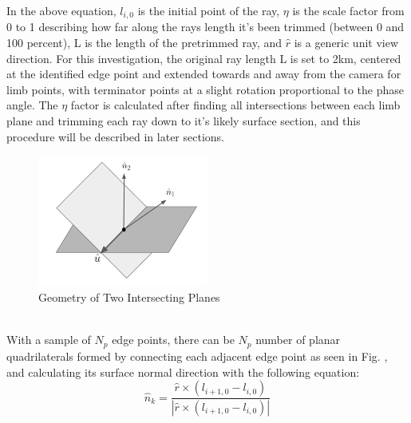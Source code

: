 In the above equation, $l_{i,0}$ is the initial point of the ray, $\eta$ is the scale factor from 0 to 1 describing how far along the rays length it's been trimmed (between 0 and 100 percent), L is the length of the pretrimmed ray, and $\hat{r}$ is a generic unit view direction. For this investigation, the original ray length L is set to 2km, centered at the identified edge point and extended towards and away from the camera for limb points, with terminator points at a slight rotation proportional to the phase angle. The $\eta$ factor is calculated after finding all intersections between each limb plane and trimming each ray down to it's likely surface section, and this procedure will be described in later sections.
\begin{figure}
    \centering
    \captionsetup{justification=centering}
    \includegraphics[width = 0.5\textwidth]{fig/planes_intersect.png}
    \caption{Geometry of Two Intersecting Planes}
    \label{fig:two_intersect}
\end{figure}
\\With a sample of $N_p$ edge points, there can be $N_p$ number of planar quadrilaterals formed by connecting each adjacent edge point as seen in Fig. 
, and calculating its surface normal direction with the following equation:
\begin{equation}
\hat{n}_k = \frac{\hat{r} \times (l_{i+1,0} - l_{i,0})}{|\hat{r} \times (l_{i+1,0} - l_{i,0})|}
\end{equation}



